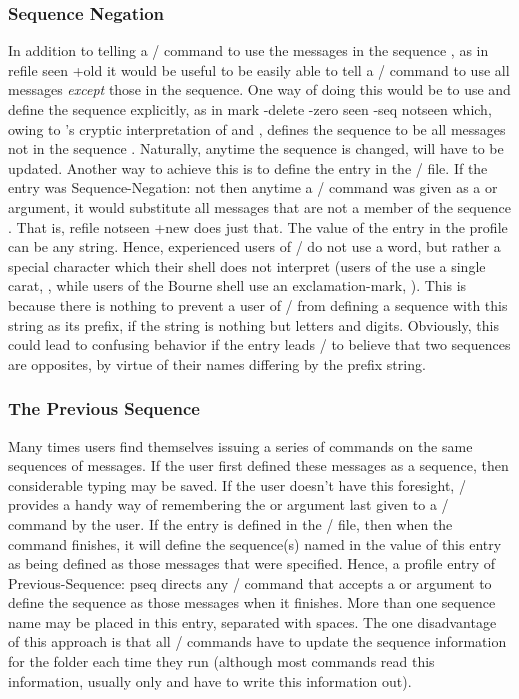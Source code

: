 \subsubsection{Sequence Negation}
In addition to telling a \MH/ command to use the messages in the sequence
, as in
\example refile seen +old\endexample
it would be useful to be easily able to tell a \MH/ command to use all
messages {\it except\/} those in the sequence.
One way of doing this would be to use  and define the sequence
explicitly,
as in
\example mark -delete -zero seen -seq notseen\endexample
which,
owing to 's cryptic interpretation of  and
,
defines the sequence  to be all messages not in the sequence
.
Naturally,
anytime the sequence  is changed,
 will have to be updated.
Another way to achieve this is to define the entry
 in the \profile/ file.
If the entry was
\example Sequence-Negation: not\endexample
then anytime a \MH/ command was given  as a  or
 argument,
it would substitute all messages that are not a member of the sequence
.
That is,
\example refile notseen +new\endexample
does just that.
The value of the  entry in the profile can be
any string.
Hence,
experienced users of \MH/ do not use a word,
but rather a special character which their shell does not interpret
(users of the  use a single carat, ,
while users of the Bourne shell use an exclamation-mark, ).
This is because there is nothing to prevent a user of \MH/ from defining a
sequence with this string as its prefix,
if the string is nothing but letters and digits.
Obviously,
this could lead to confusing behavior
if the  entry leads \MH/ to believe that two
sequences are opposites, by virtue of their names differing by the prefix
string.
\subsubsection{The Previous Sequence}
Many times users find themselves issuing a series of commands on the same
sequences of messages.
If the user first defined these messages as a sequence,
then considerable typing may be saved.
If the user doesn't have this foresight,
\MH/ provides a handy way of remembering the  or
 argument last given to a \MH/ command by the user.
If the entry  is defined in the \profile/ file,
then when the command finishes,
it will define the sequence(s) named in the value of this entry as being
defined as those messages that were specified.
Hence, a profile entry of
\example Previous-Sequence: pseq\endexample
directs any \MH/ command that accepts a  or  argument to
define the sequence  as those messages when it finishes.
More than one sequence name may be placed in this entry,
separated with spaces.
The one disadvantage of this approach
is that all \MH/ commands have to update the sequence information for
the folder each time they run
(although most commands read this information,
usually only  and  have to write this information out).
